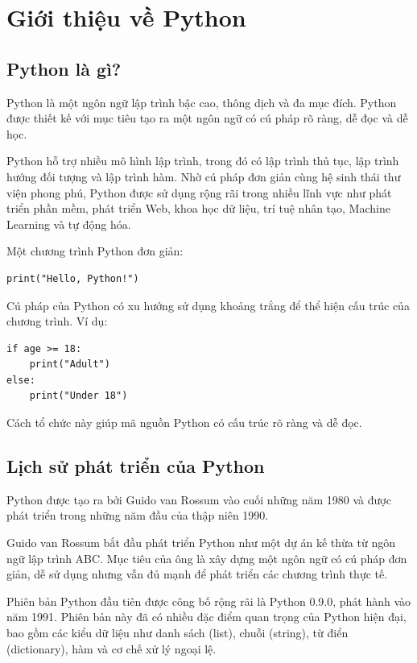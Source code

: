 \chapter{Giới thiệu về Python}

\section{Python là gì?}

Python là một ngôn ngữ lập trình bậc cao, thông dịch và đa mục đích.
Python được thiết kế với mục tiêu tạo ra một ngôn ngữ có cú pháp rõ ràng,
dễ đọc và dễ học.

Python hỗ trợ nhiều mô hình lập trình, trong đó có lập trình thủ tục,
lập trình hướng đối tượng và lập trình hàm. Nhờ cú pháp đơn giản cùng
hệ sinh thái thư viện phong phú, Python được sử dụng rộng rãi trong
nhiều lĩnh vực như phát triển phần mềm, phát triển Web, khoa học dữ liệu,
trí tuệ nhân tạo, Machine Learning và tự động hóa.

Một chương trình Python đơn giản:

\begin{lstlisting}
print("Hello, Python!")
\end{lstlisting}

Cú pháp của Python có xu hướng sử dụng khoảng trắng để thể hiện cấu trúc
của chương trình. Ví dụ:

\begin{lstlisting}
if age >= 18:
    print("Adult")
else:
    print("Under 18")
\end{lstlisting}

Cách tổ chức này giúp mã nguồn Python có cấu trúc rõ ràng và dễ đọc.

\section{Lịch sử phát triển của Python}

Python được tạo ra bởi Guido van Rossum vào cuối những năm 1980 và
được phát triển trong những năm đầu của thập niên 1990.

Guido van Rossum bắt đầu phát triển Python như một dự án kế thừa từ
ngôn ngữ lập trình ABC. Mục tiêu của ông là xây dựng một ngôn ngữ có
cú pháp đơn giản, dễ sử dụng nhưng vẫn đủ mạnh để phát triển các
chương trình thực tế.

Phiên bản Python đầu tiên được công bố rộng rãi là Python 0.9.0,
phát hành vào năm 1991. Phiên bản này đã có nhiều đặc điểm quan trọng
của Python hiện đại, bao gồm các kiểu dữ liệu như danh sách (list),
chuỗi (string), từ điển (dictionary), hàm và cơ chế xử lý ngoại lệ.


